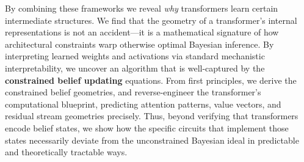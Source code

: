 \documentclass{article}
\theoremstyle{plain}
\theoremstyle{definition}
\theoremstyle{remark}
\begin{document}

By combining these frameworks we reveal \emph{why} transformers learn certain intermediate structures. We find that the geometry of a transformer’s internal representations is not an accident—it is a mathematical signature of how architectural constraints warp otherwise optimal Bayesian inference. 
By interpreting learned weights and activations via standard mechanistic interpretability, we uncover an algorithm that is well-captured by the \textbf{constrained belief updating} equations. 
From first principles, we derive the constrained belief geometries, and reverse-engineer the transformer’s computational blueprint, predicting attention patterns, value vectors, and residual stream geometries precisely.
Thus, beyond verifying that transformers encode belief states, we show how the specific circuits that implement those states necessarily deviate from the unconstrained Bayesian ideal in predictable and theoretically tractable ways. 
\end{document}
